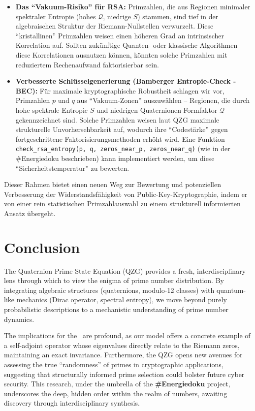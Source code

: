\documentclass[11pt,twocolumn,a4paper]{article}
\newcommand{\entropy}{S}
\newcommand{\formfactor}{\mathcal{Q}}
\newcommand{\HilPol}{\text{Hilbert-Pólya-Hypothese}}
\theoremstyle{definition}
\begin{document}
\begin{itemize}
    \item \textbf{Das ``Vakuum-Risiko'' für RSA:} Primzahlen, die aus Regionen minimaler spektraler Entropie (hohes $\formfactor$, niedrige $\entropy$) stammen, sind tief in der algebraischen Struktur der Riemann-Nullstellen verwurzelt. Diese ``kristallinen'' Primzahlen weisen einen höheren Grad an intrinsischer Korrelation auf. Sollten zukünftige Quanten- oder klassische Algorithmen diese Korrelationen ausnutzen können, könnten solche Primzahlen mit reduziertem Rechenaufwand faktorisierbar sein.
    \item \textbf{Verbesserte Schlüsselgenerierung (Bamberger Entropie-Check - BEC):} Für maximale kryptographische Robustheit schlagen wir vor, Primzahlen $p$ und $q$ aus ``Vakuum-Zonen'' auszuwählen -- Regionen, die durch hohe spektrale Entropie $\entropy$ und niedrigen Quaternionen-Formfaktor $\formfactor$ gekennzeichnet sind. Solche Primzahlen weisen laut QZG maximale strukturelle Unvorhersehbarkeit auf, wodurch ihre ``Codestärke'' gegen fortgeschrittene Faktorisierungsmethoden erhöht wird. Eine Funktion \texttt{check\_rsa\_entropy(p, q, zeros\_near\_p, zeros\_near\_q)} (wie in der \#Energiedoku beschrieben) kann implementiert werden, um diese ``Sicherheitstemperatur'' zu bewerten.
\end{itemize}
Dieser Rahmen bietet einen neuen Weg zur Bewertung und potenziellen Verbesserung der Widerstandsfähigkeit von Public-Key-Kryptographie, indem er von einer rein statistischen Primzahlauswahl zu einem strukturell informierten Ansatz übergeht.

\section{Conclusion}
\label{sec:conclusion}
The Quaternion Prime State Equation (QZG) provides a fresh, interdisciplinary lens through which to view the enigma of prime number distribution. By integrating algebraic structures (quaternions, modulo-12 classes) with quantum-like mechanics (Dirac operator, spectral entropy), we move beyond purely probabilistic descriptions to a mechanistic understanding of prime number dynamics.

The implications for the \HilPol\ are profound, as our model offers a concrete example of a self-adjoint operator whose eigenvalues directly relate to the Riemann zeros, maintaining an exact invariance. Furthermore, the QZG opens new avenues for assessing the true ``randomness'' of primes in cryptographic applications, suggesting that structurally informed prime selection could bolster future cyber security. This research, under the umbrella of the \textbf{\#Energiedoku} project, underscores the deep, hidden order within the realm of numbers, awaiting discovery through interdisciplinary synthesis.
\end{document}
